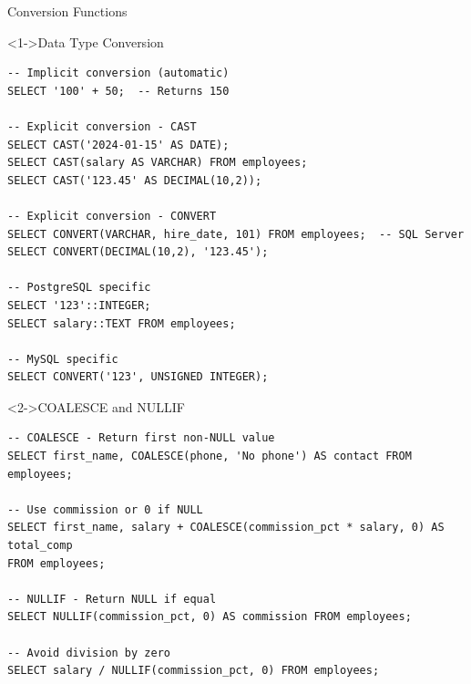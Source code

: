 \documentclass[aspectratio=169,11pt]{beamer}
\begin{document}
\begin{frame}[fragile]{Conversion Functions}
\begin{exampleblock}<1->{Data Type Conversion}
\begin{lstlisting}
-- Implicit conversion (automatic)
SELECT '100' + 50;  -- Returns 150

-- Explicit conversion - CAST
SELECT CAST('2024-01-15' AS DATE);
SELECT CAST(salary AS VARCHAR) FROM employees;
SELECT CAST('123.45' AS DECIMAL(10,2));

-- Explicit conversion - CONVERT
SELECT CONVERT(VARCHAR, hire_date, 101) FROM employees;  -- SQL Server
SELECT CONVERT(DECIMAL(10,2), '123.45');

-- PostgreSQL specific
SELECT '123'::INTEGER;
SELECT salary::TEXT FROM employees;

-- MySQL specific
SELECT CONVERT('123', UNSIGNED INTEGER);
\end{lstlisting}
\end{exampleblock}

\pause
\begin{exampleblock}<2->{COALESCE and NULLIF}
\begin{lstlisting}
-- COALESCE - Return first non-NULL value
SELECT first_name, COALESCE(phone, 'No phone') AS contact FROM employees;

-- Use commission or 0 if NULL
SELECT first_name, salary + COALESCE(commission_pct * salary, 0) AS total_comp
FROM employees;

-- NULLIF - Return NULL if equal
SELECT NULLIF(commission_pct, 0) AS commission FROM employees;

-- Avoid division by zero
SELECT salary / NULLIF(commission_pct, 0) FROM employees;
\end{lstlisting}
\end{exampleblock}
\end{frame}
\end{document}
